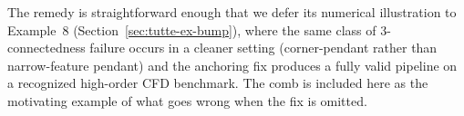 \documentclass[11pt]{article}
\begin{document}
The remedy is straightforward enough that we defer its numerical
illustration to Example~8 (Section~\ref{sec:tutte-ex-bump}),
where the same class of $3$-connectedness failure occurs in a
cleaner setting (corner-pendant rather than narrow-feature
pendant) and the anchoring fix produces a fully valid pipeline
on a recognized high-order CFD benchmark. The comb is included
here as the motivating example of what goes wrong when the fix
is omitted.
\fi  %





\end{document}
